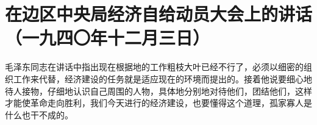 \section[在边区中央局经济自给动员大会上的讲话（一九四〇年十二月三日）]{在边区中央局经济自给动员大会上的讲话（一九四〇年十二月三日）}


毛泽东同志在讲话中指出现在根据地的工作粗枝大叶已经不行了，必须以细密的组织工作来代替，经济建设的任务就是适应现在的环境而提出的。接着他说要细心地待人接物，仔细地认识自己周围的人物，具体地分别地对待他们，团结他们，这样才能使革命走向胜利，我们今天进行的经济建设，也要懂得这个道理，孤家寡人是什么也干不成的。

